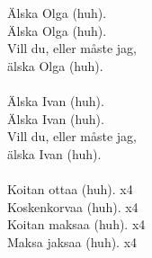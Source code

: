 
Älska Olga (huh). \\ Älska Olga (huh). \\ Vill du, eller måste jag, \\ älska Olga (huh). \\ \hspace{10mm} \\ Älska Ivan (huh). \\ Älska Ivan (huh). \\ Vill du, eller måste jag, \\ älska Ivan (huh). \\ \hspace{10mm} \\ Koitan ottaa (huh). x4 \\ Koskenkorvaa (huh). x4 \\ Koitan maksaa (huh). x4 \\ Maksa jaksaa (huh). x4